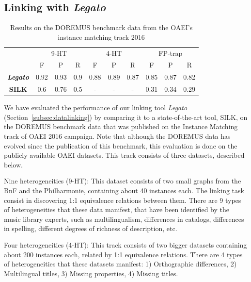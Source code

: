
\subsection{Linking with \textit{Legato}} \label{sec:eval-link}
\begin{table}[t]
\begin{center}
	\begin{tabular}{|c|c|c|c|c|c|c|c|c|c|}
		\hline
		{}{}{} & \multicolumn{3}{c|}{9-HT} & %
		\multicolumn{3}{c|}{4-HT} &  \multicolumn{3}{c|}{FP-trap}\\
		\cline{2-10}
		& F & P & R & F & P & R & F & P & R \\
		\hline
		\textbf{\textbf{\textit{Legato}}} & 0.92 & 0.93 & 0.9 & 0.88 & 0.89 & 0.87 & 0.85 & 0.87 & 0.82 \\
		\hline
		\textbf{SILK} & 0.6 & 0.76 & 0.5 & - & - & - & 0.31 & 0.34 & 0.29\\
		\hline
	\end{tabular}
	\caption{Results on the DOREMUS benchmark data from the OAEI's instance matching track 2016}
	\label{table:doremus}
\end{center}
\end{table}

We have evaluated the performance of our linking tool \textit{Legato} (Section~\ref{subsec:datalinking}) by comparing it to a state-of-the-art tool, SILK, on the DOREMUS benchmark data that was published on the Instance Matching track of OAEI 2016 campaign. Note that although the DOREMUS data has evolved since the publication of this benchmark, this evaluation is done on the publicly available OAEI datasets. This track consists of three datasets, described below. 

Nine heterogeneities (9-HT): This dataset consists of two small graphs from the BnF and the Philharmonie, containing about 40 instances each. The linking task consist in discovering 1:1 equivalence relations between them. There are 9 types of heterogeneities that these data manifest, that have been identified by the music library experts, such as multilingualism, differences in catalogs, differences in spelling, different degrees of richness of description, etc.

Four heterogeneities (4-HT): This track consists of two bigger datasets containing about 200 instances each, related by 1:1 equivalence relations. There are 4 types of heterogeneities that these datasets manifest: 1) Orthographic differences, 2) Multilingual titles, 3) Missing properties, 4) Missing titles.

